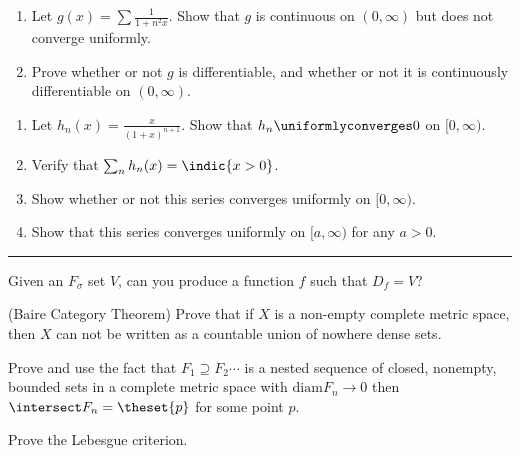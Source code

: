 \begin{problem}
\begin{enumerate}
  \item Let $g(x) = \sum \frac 1 {1 + n^2 x}$. Show that $g$ is continuous on $(0, \infty)$ but does not converge uniformly.
  \item Prove whether or not $g$ is differentiable, and whether or not it is continuously differentiable on $(0, \infty)$.
\end{enumerate}
\end{problem}


\begin{problem}
\begin{enumerate}
  \item Let $h_n(x) = \frac x {(1+x)^{n+1}}$. Show that $h_n \uniformlyconverges 0$ on $[0, \infty)$.
  \item Verify that $\sum_n h_n(x) = \indic{x > 0}$.
  \item Show whether or not this series converges uniformly on $[0, \infty)$.
  \item Show that this series converges uniformly on $[a, \infty)$ for any $a>0$.
\end{enumerate}
\end{problem}

\vspace{2em}\hrule

\begin{problem}
  Given an $F_\sigma$ set $V$, can you produce a function $f$ such that $D_f = V$?
\end{problem}

\begin{problem}
  (Baire Category Theorem) Prove that if $X$ is a non-empty complete metric space, then $X$ can not be written as a countable union of nowhere dense sets.

  Prove and use the fact that $F_1 \supseteq F_2 \cdots$ is a nested sequence of closed, nonempty, bounded sets in a complete metric space with $\mathrm{diam} F_n  \to 0$ then $\intersect F_n = \theset{p}$ for some point $p$.
\end{problem}

\begin{problem}
  Prove the Lebesgue criterion.
\end{problem}
